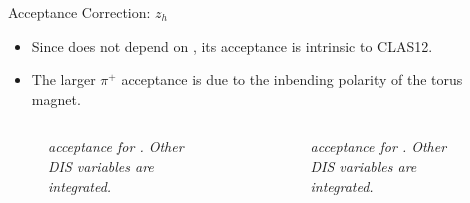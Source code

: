 \begin{frame}{Acceptance Correction: $z_h$}
    \label{11.54::zh}

    \begin{itemize}
        \item
            Since  does not depend on \efe{$\theta$}, its acceptance is intrinsic to CLAS12.

        \vspace{6pt}
        \item
            The larger $\pi^+$ acceptance is due to the inbending polarity of the torus magnet.
    \end{itemize}

    \vspace{-12pt}
    \begin{columns}
        \begin{column}{.49\linewidth}
            \begin{center}
                \begin{figure}[t]
                    \scriptsize{\textit{
                         acceptance for \ef{$\pi^-$}.
                        Other DIS variables are integrated.
                    }}
                \end{figure}
            \end{center}
        \end{column}

        \begin{column}{.49\linewidth}
            \begin{center}
                \begin{figure}[t]
                    \scriptsize{\textit{
                         acceptance for \ef{$\pi^+$}.
                        Other DIS variables are integrated.
                    }}
                \end{figure}
            \end{center}
        \end{column}
    \end{columns}


\end{frame}
